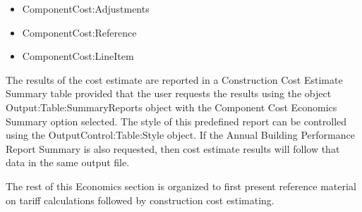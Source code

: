 \begin{itemize}
\item
  ComponentCost:Adjustments
\item
  ComponentCost:Reference
\item
  ComponentCost:LineItem
\end{itemize}

The results of the cost estimate are reported in a Construction Cost Estimate Summary table provided that the user requests the results using the object Output:Table:SummaryReports object with the Component Cost Economics Summary option selected. The style of this predefined report can be controlled using the OutputControl:Table:Style object. If the Annual Building Performance Report Summary is also requested, then cost estimate results will follow that data in the same output file.

The rest of this Economics section is organized to first present reference material on tariff calculations followed by construction cost estimating.